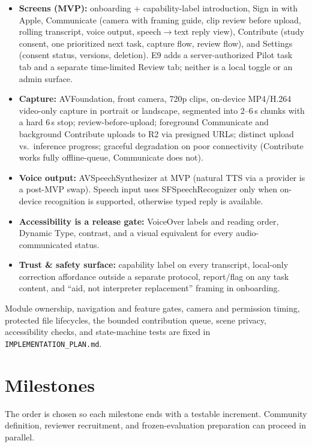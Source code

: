 \documentclass[11pt]{article}
\newcommand{\code}[1]{\texttt{#1}}
\begin{document}
\begin{itemize}[nosep]
  \item \textbf{Screens (MVP):} onboarding + capability-label introduction,
        Sign in with Apple, Communicate (camera with framing guide, clip review
        before upload, rolling transcript, voice output, speech$\to$text reply
        view), Contribute (study consent, one prioritized next task, capture flow,
        review flow),
        and Settings (consent status, versions, deletion).
        E9 adds a server-authorized Pilot task tab and a separate time-limited Review
        tab; neither is a local toggle or an admin surface.
  \item \textbf{Capture:} AVFoundation, front camera, 720p clips, on-device
        MP4/H.264 video-only capture in portrait or landscape, segmented into
        2--6\,s chunks with a hard 6\,s stop; review-before-upload;
        foreground Communicate and background Contribute uploads to R2 via presigned
        URLs; distinct upload vs.\ inference
        progress; graceful degradation on poor connectivity (Contribute works fully
        offline-queue, Communicate does not).
  \item \textbf{Voice output:} AVSpeechSynthesizer at MVP (natural TTS via a
        provider is a post-MVP swap). Speech input uses SFSpeechRecognizer only when
        on-device recognition is supported, otherwise typed reply is available.
  \item \textbf{Accessibility is a release gate:} VoiceOver labels and reading
        order, Dynamic Type, contrast, and a visual equivalent for every
        audio-communicated status.
  \item \textbf{Trust \& safety surface:} capability label on every transcript,
        local-only correction affordance outside a separate protocol, report/flag on
        any task content, and ``aid, not interpreter replacement'' framing in
        onboarding.
\end{itemize}

Module ownership, navigation and feature gates, camera and permission timing,
protected file lifecycles, the bounded contribution queue, scene privacy, accessibility
checks, and state-machine tests are fixed in \code{IMPLEMENTATION\_PLAN.md}.

\section{Milestones}

The order is chosen so each milestone ends with a testable increment. Community
definition, reviewer recruitment, and frozen-evaluation preparation can proceed in
parallel.
\end{document}
